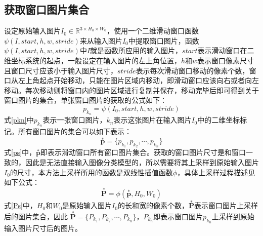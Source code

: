 \subsection{获取窗口图片集合}
设定原始输入图片$I_0 \in \mathbb{R}^{3\times H_0 \times W_0}$，使用一个二维滑动窗口函数$\psi(I, start, h, w, stride)$来从输入图片$I_0$中提取窗口图片，函数$\psi(I, start, h, w, stride)$中$I$就是函数所应用的输入图片，$start$表示滑动窗口在二维坐标系统的起点，一般设定在输入图片的左上角位置，$h$和$w$表示窗口像素尺寸且窗口尺寸应该小于输入图片尺寸，$stride$表示每次滑动窗口移动的像素个数，窗口从左上角起点开始移动，只能在图片区域内移动，即滑动窗口应该向右或者向左移动。每次移动则将窗口内的图片区域进行复制并保存，移动完毕后即可得到关于窗口图片的集合，单张窗口图片的获取的公式如下：
\begin{equation}
	p_{k_n}=\psi(I_0,start,h,w,stride)
	\label{pkn}
\end{equation}
式\ref{pkn}中$p_{k_n}$表示一张窗口图片，$k_n$表示这张图片在输入图片$I_0$中的二维坐标标记。所有窗口图片的集合可以如下表示：
\begin{equation}
	\overset{*}{\bm{p}}=\{p_{k_1},p_{k_2},\cdots,p_{k_n}\}
\label{ps}
\end{equation}
式\ref{ps}中，$\overset{*}{\bm{p}}$即表示滑动窗口所有窗口图片集合。获取的窗口图片尺寸是和窗口一致的，因此是无法直接输入图像分类模型的，所以需要将其上采样到原始输入图片$I_0$的尺寸，本方法上采样所用的函数是双线性插值函数$\phi$，具体上采样过程描述见如下公式：
\begin{equation}
	\overset{*}{\bm{P}}=\phi(\overset{*}{\bm{p}},H_0,W_0) 
\label{Ps}
\end{equation}
式\ref{Ps}中，$H_0$和$W_0$是原始输入图片$I_0$的长和宽的像素个数，$\overset{*}{\bm{P}}$表示窗口图片上采样后的图片集合，因此 $\overset{*}{\bm{P}}=\{P_{k_1},P_{k_2},\cdots,P_{k_n}\}$，$P_{k_n}$即表示窗口图片$p_{k_n}$上采样到原始输入图片尺寸后的图片。

